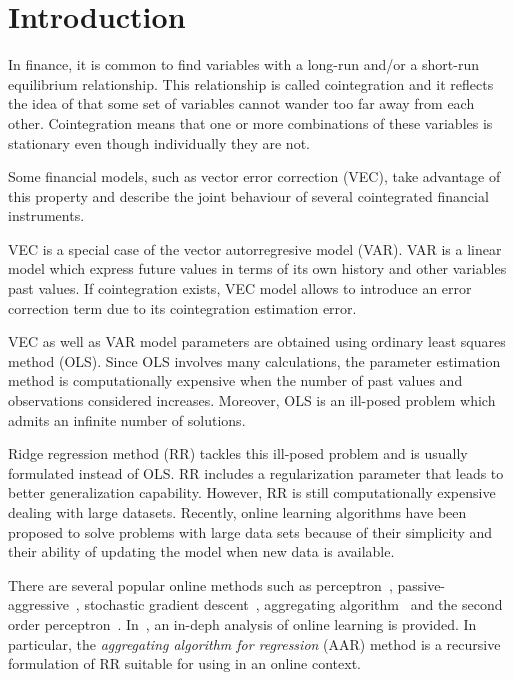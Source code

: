 \section{Introduction}
In finance, it is common to find variables with a long-run and/or a short-run
equilibrium relationship. This relationship is called cointegration and it
reflects the idea of that some set of variables cannot wander too far away from
each other. 
Cointegration means that one or more combinations of these variables is
stationary even though individually they are not.

Some financial models, such as  vector error correction (VEC), take advantage of
this property and describe the joint behaviour of several cointegrated
financial instruments.

VEC is a special case of the vector autorregresive model (VAR). VAR is a linear
model which express future values in terms of its own history and other
variables past values. If cointegration exists, VEC model allows to introduce an
error correction term due to its cointegration estimation error. 

VEC as well as VAR model parameters are obtained using ordinary least squares
method (OLS).   Since OLS involves many calculations, the parameter estimation
method is computationally expensive when the number of past values and
observations considered increases. Moreover, OLS is an ill-posed problem which
admits an infinite number of solutions. 

Ridge regression method (RR) tackles this ill-posed problem and is usually
formulated instead of OLS. RR includes a regularization parameter that leads to
better generalization capability. However, RR is still computationally
expensive dealing with large datasets. Recently, online learning algorithms
have been proposed to solve problems with large data sets because of their
simplicity and their ability of updating the model when new data is available. 

There are several popular online methods such as
perceptron~\cite{rosenblatt58}, passive-aggressive~\cite{crammerETall2006},
stochastic gradient descent~\cite{zhang2004}, aggregating
algorithm~\cite{vovk2001} and the second order
perceptron~\cite{cesa-bianchi2005}.  In~\cite{cesa-bianchi2006}, an in-deph
analysis of online learning is provided.  In particular, the {\em aggregating
algorithm for regression} (AAR) method is a recursive formulation of RR
suitable for using in an online context.

